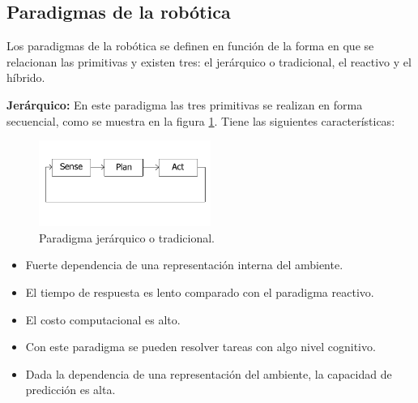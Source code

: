 \documentclass[a4paper]{article}
\begin{document}
\subsection{Paradigmas de la robótica}
Los paradigmas de la robótica se definen en función de la forma en que se relacionan las primitivas y existen tres: el jerárquico o tradicional, el reactivo y el híbrido. 

\textbf{Jerárquico:} En este paradigma las tres primitivas se realizan en forma secuencial, como se muestra en la figura  \ref{fig:ParadigmHierarchical}. Tiene las siguientes características:
\begin{figure}
  \centering
  \includegraphics[width=0.5\textwidth]{Figures/Hierarchical.png}
  \caption{Paradigma jerárquico o tradicional.}
  \label{fig:ParadigmHierarchical}
\end{figure}
\begin{itemize}
\item Fuerte dependencia de una representación interna del ambiente. 
\item El tiempo de respuesta es lento comparado con el paradigma reactivo. 
\item El costo computacional es alto.
\item Con este paradigma se pueden resolver tareas con algo nivel cognitivo.
\item Dada la dependencia de una representación del ambiente, la capacidad de predicción es alta.
\end{itemize}
\end{document}
